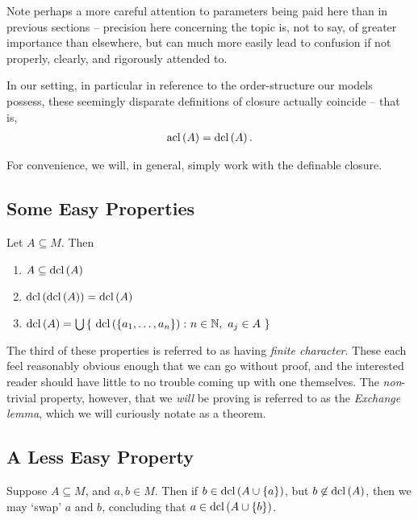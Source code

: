 Note perhaps a more careful attention to parameters being paid here than in previous sections -- precision here concerning the topic is, not to say, of greater importance than elsewhere, but can much more easily lead to confusion if not properly, clearly, and rigorously attended to.


In our setting, in particular in reference to the order-structure our models possess, these seemingly disparate definitions of closure actually coincide -- that is,
\begin{align*}
  \operatorname{acl}\left(A\right) = \operatorname{dcl}\left(A\right).
\end{align*}

For convenience, we will, in general, simply work with the definable closure.

\subsection{Some Easy Properties}

\begin{proposition}
\leavevmode
Let $A \subseteq M$. Then
  \begin{enumerate}
    \item $A \subseteq \operatorname{dcl}\left(A\right)$
    \item $\operatorname{dcl}\left(\operatorname{dcl}\left(A\right)\right) = \operatorname{dcl}\left(A\right)$
    \item $\dcl{A} = \bigcup \left\{ \ \dcl{\{a_1, \hdots, a_n\}} \colon n \in \N, \ a_j \in A \ \right\}$
  \end{enumerate}
\end{proposition}

The third of these properties is referred to as having \emph{finite character}. These each feel reasonably obvious enough that we can go without proof, and the interested reader should have little to no trouble coming up with one themselves. The \emph{non}-trivial property, however, that we \emph{will} be proving is referred to as the \emph{Exchange lemma}, which we will curiously notate as a theorem.

\subsection{A Less Easy Property}

\begin{theorem}
  \label{thm:exchange}
  Suppose $A \subseteq M$, and $a, b \in M$. Then if $b \in \operatorname{dcl}\left(A \cup \{ a \}\right)$, but $b \not\in \operatorname{dcl}\left(A\right)$, then we may `swap' $a$ and $b$, concluding that $a \in \operatorname{dcl}\left(A \cup \{ b \}\right)$.
\end{theorem}

